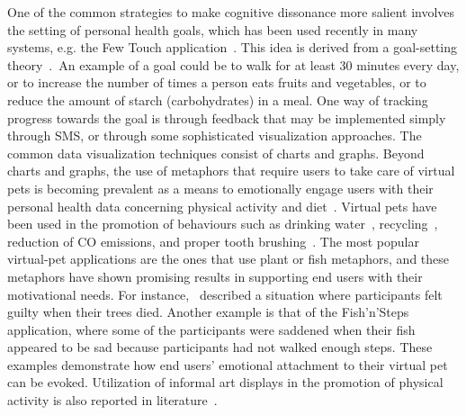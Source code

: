 One of the common strategies to make cognitive dissonance more salient involves the setting of personal health goals, which has been used recently in many systems, e.g. the Few Touch application~\citep{arsand:mobile}. This idea is derived from a goal-setting theory~\citep{strecher1995goal}.~An example of a goal could be to walk for at least 30 minutes every day, or to increase the number of times a person eats fruits and vegetables, or to reduce the amount of starch (carbohydrates) in a meal. One way of tracking progress towards the goal is through feedback that may be implemented simply through SMS, or through some sophisticated visualization approaches. The common data visualization techniques consist of charts and graphs. Beyond charts and graphs, the use of metaphors that require users to take care of virtual pets is becoming prevalent as a means to emotionally engage users with their personal health data concerning physical activity and diet~\citep{lin2006:fish,albaina2009flowie,klasnja2009:using,pollak2010s,nakajima2013designing}. Virtual pets have been used in the promotion of behaviours such as drinking water~\citep{lessel2016watercoaster}, recycling~\citep{comber2013designing}, reduction of CO emissions, and proper tooth brushing~\citep{nakajima2013designing}. The most popular virtual-pet applications are the ones that use plant or fish metaphors, and these metaphors have shown promising results in supporting end users with their motivational needs. For instance,~\cite{nakajima2013designing} described a situation where participants felt guilty when their trees died. Another example is that of the Fish'n'Steps~\citep{lin2006:fish} application, where some of the participants were saddened when their fish appeared to be sad because participants had not walked enough steps. These examples demonstrate how end users' emotional attachment to their virtual pet can be evoked. Utilization of informal art displays in the promotion of physical activity is also reported in literature~\citep{fan2012spark,nakajima2013designing}. 

